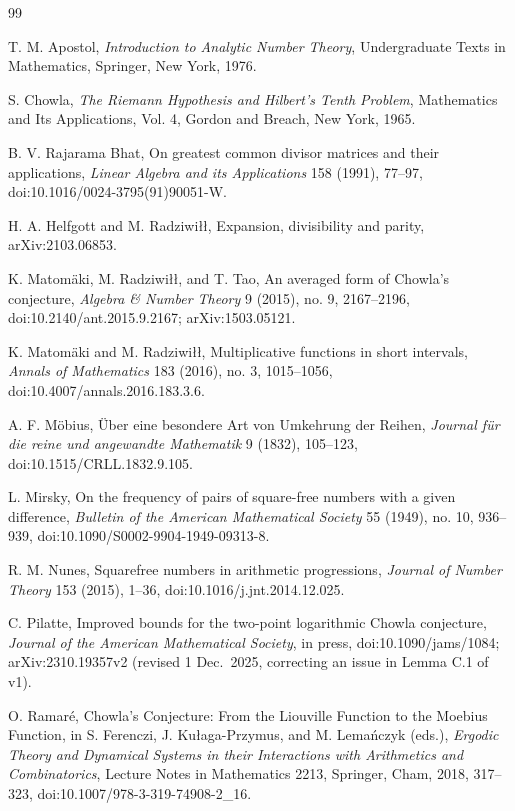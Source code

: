 \documentclass[11pt]{amsart}
\numberwithin{equation}{section}
\theoremstyle{plain}
\theoremstyle{definition}
\theoremstyle{remark}
\begin{document}
\begin{thebibliography}{99}

T. M. Apostol,
\emph{Introduction to Analytic Number Theory},
Undergraduate Texts in Mathematics, Springer, New York, 1976.

S. Chowla,
\emph{The Riemann Hypothesis and Hilbert's Tenth Problem},
Mathematics and Its Applications, Vol. 4, Gordon and Breach, New York, 1965.

B. V. Rajarama Bhat,
On greatest common divisor matrices and their applications,
\emph{Linear Algebra and its Applications} 158 (1991), 77--97,
doi:10.1016/0024-3795(91)90051-W.

H. A. Helfgott and M. Radziwi{\l}{\l},
Expansion, divisibility and parity,
arXiv:2103.06853.

K. Matomäki, M. Radziwi{\l}{\l}, and T. Tao,
An averaged form of Chowla's conjecture,
\emph{Algebra \& Number Theory} 9 (2015), no. 9, 2167--2196,
doi:10.2140/ant.2015.9.2167; arXiv:1503.05121.

K. Matomäki and M. Radziwi{\l}{\l},
Multiplicative functions in short intervals,
\emph{Annals of Mathematics} 183 (2016), no. 3, 1015--1056,
doi:10.4007/annals.2016.183.3.6.

A. F. Möbius,
Über eine besondere Art von Umkehrung der Reihen,
\emph{Journal für die reine und angewandte Mathematik} 9 (1832), 105--123,
doi:10.1515/CRLL.1832.9.105.

L. Mirsky,
On the frequency of pairs of square-free numbers with a given difference,
\emph{Bulletin of the American Mathematical Society} 55 (1949), no. 10, 936--939,
doi:10.1090/S0002-9904-1949-09313-8.

R. M. Nunes,
Squarefree numbers in arithmetic progressions,
\emph{Journal of Number Theory} 153 (2015), 1--36,
doi:10.1016/j.jnt.2014.12.025.

C. Pilatte,
Improved bounds for the two-point logarithmic Chowla conjecture,
\emph{Journal of the American Mathematical Society}, in press,
doi:10.1090/jams/1084; arXiv:2310.19357v2 (revised 1 Dec.\ 2025, correcting an issue in Lemma C.1 of v1).

O. Ramaré,
Chowla's Conjecture: From the Liouville Function to the Moebius Function,
in S. Ferenczi, J. Kułaga-Przymus, and M. Lemańczyk (eds.),
\emph{Ergodic Theory and Dynamical Systems in their Interactions with Arithmetics and Combinatorics},
Lecture Notes in Mathematics 2213, Springer, Cham, 2018, 317--323,
doi:10.1007/978-3-319-74908-2\_16.


\end{thebibliography}
\end{document}
